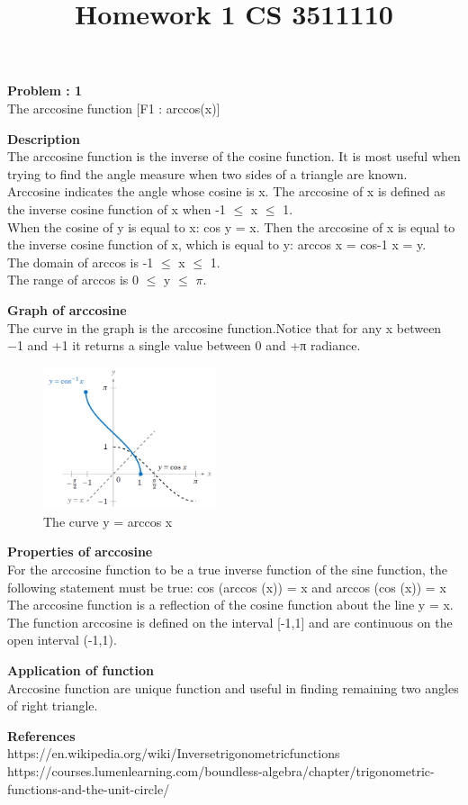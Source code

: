 \documentclass[11pt]{article}
\begin{document}
\title{Homework 1 CS 3511110}

\thispagestyle{empty}

\begin{center}
{\LARGE \bf Problem : 1 }\\
{\large The arccosine function [F1 : arccos(x)] }\\
\end{center}

\textbf{Description}\\
The arccosine function is the inverse of the cosine function. It is most useful when trying to find the angle measure when two sides of a triangle are known.\\
Arccosine indicates the angle whose cosine is x. The arccosine of x is defined as the inverse cosine function of x when -1 $\leq$ x $\leq$ 1.\\
When the cosine of y is equal to x: cos y = x. Then the arccosine of x is equal to the inverse cosine function of x, which is equal to y: arccos x = cos-1 x = y.\\
The domain of arccos is -1 $\leq$ x $\leq$ 1.\\
The range of arccos is 0 $\leq$ y $\leq$ $\pi$.

\textbf{Graph of arccosine}\\
The curve in the graph is the arccosine function.Notice that for any x between −1 and +1 it returns a single value between 0 and +π radiance.
\begin{figure}[h]
    \centering
    \includegraphics[width=0.45\textwidth]{Last.png}
    \caption{The curve y = arccos x}
\end{figure}

\textbf{Properties of arccosine}\\
For the arccosine function to be a true inverse function of the sine function, the following statement must be true: cos (arccos (x))  =   x   and   arccos (cos (x))  =  x\\
The arccosine function is a reflection of the cosine function about the line y = x.\\
The function  arccosine  is defined on the interval [-1,1] and are continuous on the open interval (-1,1).

\textbf{Application of function}\\
Arccosine function are unique function and useful in finding remaining two angles of right triangle.

\textbf{References}\\
https://en.wikipedia.org/wiki/Inverse\textunderscore trigonometric\textunderscore functions\\
https://courses.lumenlearning.com/boundless-algebra/chapter/trigonometric-functions-and-the-unit-circle/
\end{document}
